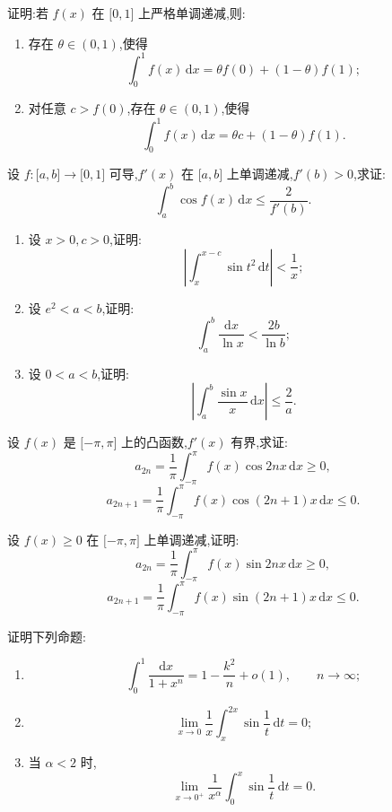 \documentclass[../数学分析培优讲义.tex]{subfiles}
\begin{document}
\begin{example}
证明:若 $f(x)$ 在 $\lbrack 0,1\rbrack$ 上严格单调递减,则:
\begin{enumerate}[label=(\arabic*)]
    \item 存在 $\theta\in(0,1)$,使得
    \[
        \int_0^1f(x)\,\mathrm{d}x=\theta f(0)+(1-\theta)f(1);
    \]
    \item 对任意 $c>f(0)$,存在 $\theta\in(0,1)$,使得
    \[
        \int_0^1f(x)\,\mathrm{d}x=\theta c+(1-\theta)f(1).
    \]
\end{enumerate}
\end{example}
\exampleblank

\begin{example}
设 $f:\lbrack a,b\rbrack\to\lbrack 0,1\rbrack$ 可导,$f'(x)$ 在 $\lbrack a,b\rbrack$ 上单调递减,$f'(b)>0$,求证:
\[
    \int_a^b\cos f(x)\,\mathrm{d}x\leq\dfrac{2}{f'(b)}.
\]
\end{example}
\exampleblank

\begin{example}
\begin{enumerate}[label=(\arabic*)]
    \item 设 $x>0,c>0$,证明:
    \[
        \left|\int_x^{x-c}\sin t^2\,\mathrm{d}t\right|<\dfrac{1}{x};
    \]
    \item 设 $e^2<a<b$,证明:
    \[
        \int_a^b\dfrac{\mathrm{d}x}{\ln x}<\dfrac{2b}{\ln b};
    \]
    \item 设 $0<a<b$,证明:
    \[
        \left|\int_a^b\dfrac{\sin x}{x}\,\mathrm{d}x\right|\leq\dfrac{2}{a}.
    \]
\end{enumerate}
\end{example}
\exampleblank

\begin{example}
设 $f(x)$ 是 $\lbrack -\pi,\pi\rbrack$ 上的凸函数,$f'(x)$ 有界,求证:
\[
    a_{2n}=\dfrac{1}{\pi}\int_{-\pi}^\pi f(x)\cos2nx\,\mathrm{d}x\geq0,
\]
\[
    a_{2n+1}=\dfrac{1}{\pi}\int_{-\pi}^\pi f(x)\cos(2n+1)x\,\mathrm{d}x\leq0.
\]
\end{example}
\exampleblank

\begin{example}
设 $f(x)\geq0$ 在 $\lbrack -\pi,\pi\rbrack$ 上单调递减,证明:
\[
    a_{2n}=\dfrac{1}{\pi}\int_{-\pi}^\pi f(x)\sin2nx\,\mathrm{d}x\geq0,
\]
\[
    a_{2n+1}=\dfrac{1}{\pi}\int_{-\pi}^\pi f(x)\sin(2n+1)x\,\mathrm{d}x\leq0.
\]
\end{example}
\exampleblank

\begin{example}
证明下列命题:
\begin{enumerate}[label=(\arabic*)]
    \item
    \[
        \int_0^1\dfrac{\mathrm{d}x}{1+x^n}
        =1-\dfrac{k^2}{n}+o(1),
        \qquad n\to\infty;
    \]
    \item
    \[
        \lim\limits_{x\to0}\dfrac{1}{x}\int_x^{2x}\sin\dfrac{1}{t}\,\mathrm{d}t=0;
    \]
    \item 当 $\alpha<2$ 时,
    \[
        \lim\limits_{x\to0^+}\dfrac{1}{x^\alpha}\int_0^x\sin\dfrac{1}{t}\,\mathrm{d}t=0.
    \]
\end{enumerate}
\end{example}
\exampleblank
\end{document}
